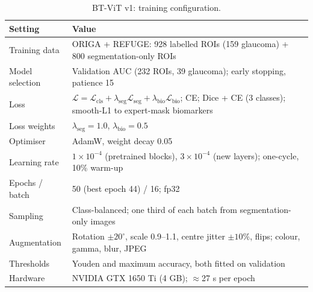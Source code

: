 \documentclass[10pt]{article}
\begin{document}
\begin{table}[h]
\centering
\begin{threeparttable}
\caption{BT-ViT v1: training configuration.}
\label{tab:v1config}
\footnotesize
\begin{tabular}{@{}ll@{}}
\toprule
Setting & Value \\
\midrule
Training data & ORIGA + REFUGE: 928 labelled ROIs (159 glaucoma) + 800 segmentation-only ROIs \\
Model selection & Validation AUC (232 ROIs, 39 glaucoma); early stopping, patience 15 \\
Loss & $\mathcal{L}=\mathcal{L}_{\mathrm{cls}}+\lambda_{\mathrm{seg}}\mathcal{L}_{\mathrm{seg}}+\lambda_{\mathrm{bio}}\mathcal{L}_{\mathrm{bio}}$;
CE; Dice + CE (3 classes); smooth-L1 to expert-mask biomarkers \\
Loss weights & $\lambda_{\mathrm{seg}}=1.0$, $\lambda_{\mathrm{bio}}=0.5$ \\
Optimiser & AdamW, weight decay 0.05 \\
Learning rate & $1{\times}10^{-4}$ (pretrained blocks), $3{\times}10^{-4}$ (new layers); one-cycle, 10\% warm-up \\
Epochs / batch & 50 (best epoch 44) / 16; fp32 \\
Sampling & Class-balanced; one third of each batch from segmentation-only images \\
Augmentation & Rotation $\pm20^{\circ}$, scale 0.9--1.1, centre jitter $\pm10\%$, flips; colour, gamma, blur, JPEG \\
Thresholds & Youden and maximum accuracy, both fitted on validation \\
Hardware & NVIDIA GTX 1650 Ti (4 GB); ${\approx}$27 s per epoch \\
\bottomrule
\end{tabular}
\end{threeparttable}
\end{table}
\end{document}
